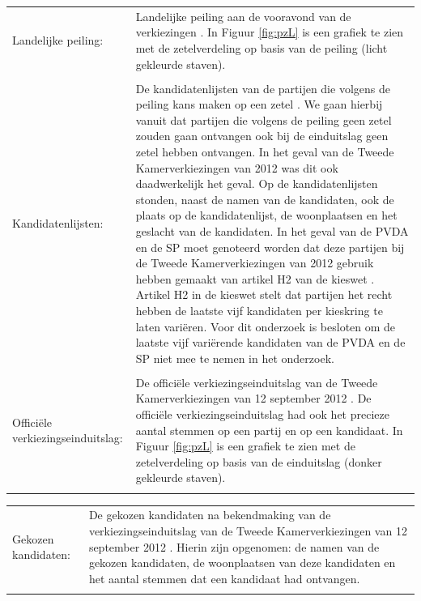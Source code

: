 \noindent\begin{tabularx}{\textwidth}{LI}
Landelijke peiling:  & Landelijke peiling aan de vooravond van de verkiezingen \citep{IPSOS}. In Figuur \ref{fig:pzL} is een grafiek te zien met de zetelverdeling  op basis van de peiling (licht gekleurde staven). \\
  \\
Kandidatenlijsten: & De kandidatenlijsten van de partijen die volgens de peiling kans maken op een zetel \citep{Kiesraad_kandidatenlijsten}. We gaan hierbij vanuit dat partijen die volgens de peiling geen zetel zouden gaan ontvangen ook bij de einduitslag geen zetel hebben ontvangen. In het geval van de Tweede Kamerverkiezingen van 2012 was dit ook daadwerkelijk het geval. Op de kandidatenlijsten stonden, naast de namen van de kandidaten, ook de plaats op de kandidatenlijst, de woonplaatsen en het geslacht van de kandidaten. In het geval van de PVDA en de SP moet genoteerd worden dat deze partijen bij de Tweede Kamerverkiezingen van 2012 gebruik hebben gemaakt van artikel H2 van de kieswet \citeyearpar{kieswetje}. Artikel H2 in de kieswet stelt dat partijen het recht hebben de laatste vijf kandidaten per kieskring te laten vari\"{e}ren. Voor dit onderzoek is besloten om de laatste vijf vari\"{e}rende kandidaten van de PVDA en de SP niet mee te nemen in het onderzoek. \\
\\
Offici\"{e}le verkiezingseinduitslag: & De officiële verkiezingseinduitslag van de Tweede Kamerverkiezingen van 12 september 2012 \citep{Kiesraad_databank}. De officiële verkiezingseinduitslag had ook het precieze aantal stemmen op een partij en op een kandidaat.  In Figuur \ref{fig:pzL} is een grafiek te zien met de zetelverdeling  op basis van de einduitslag (donker gekleurde staven).  \\
\\  
\end{tabularx}

\noindent\begin{tabularx}{\textwidth}{LI}
Gekozen kandidaten:  & De gekozen kandidaten na bekendmaking van de verkiezingseinduitslag van de Tweede Kamerverkiezingen van 12 september 2012 \citep{Kiesraad_uitslag}. Hierin zijn opgenomen: de namen van de gekozen kandidaten, de woonplaatsen van deze kandidaten en het aantal stemmen dat een kandidaat had ontvangen. \\
  \\
\end{tabularx}

